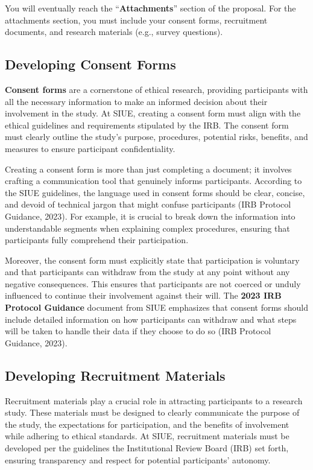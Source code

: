 \documentclass[
]{book}
\begin{document}
You will eventually reach the ``\textbf{Attachments}'' section of the proposal. For the attachments section, you must include your consent forms, recruitment documents, and research materials (e.g., survey questions).

\subsection*{Developing Consent Forms}\label{developing-consent-forms}

\textbf{Consent forms} are a cornerstone of ethical research, providing participants with all the necessary information to make an informed decision about their involvement in the study. At SIUE, creating a consent form must align with the ethical guidelines and requirements stipulated by the IRB. The consent form must clearly outline the study's purpose, procedures, potential risks, benefits, and measures to ensure participant confidentiality.

Creating a consent form is more than just completing a document; it involves crafting a communication tool that genuinely informs participants. According to the SIUE guidelines, the language used in consent forms should be clear, concise, and devoid of technical jargon that might confuse participants (IRB Protocol Guidance, 2023). For example, it is crucial to break down the information into understandable segments when explaining complex procedures, ensuring that participants fully comprehend their participation.

Moreover, the consent form must explicitly state that participation is voluntary and that participants can withdraw from the study at any point without any negative consequences. This ensures that participants are not coerced or unduly influenced to continue their involvement against their will. The \textbf{2023 IRB Protocol Guidance} document from SIUE emphasizes that consent forms should include detailed information on how participants can withdraw and what steps will be taken to handle their data if they choose to do so (IRB Protocol Guidance, 2023).

\subsection*{Developing Recruitment Materials}\label{developing-recruitment-materials}

Recruitment materials play a crucial role in attracting participants to a research study. These materials must be designed to clearly communicate the purpose of the study, the expectations for participation, and the benefits of involvement while adhering to ethical standards. At SIUE, recruitment materials must be developed per the guidelines the Institutional Review Board (IRB) set forth, ensuring transparency and respect for potential participants' autonomy.
\end{document}

